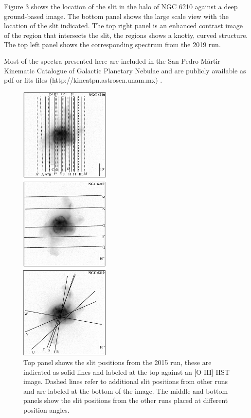 \documentclass[useAMS, usenatbib]{mnras}
\begin{document}
Figure 3 shows the location of the slit in the halo of NGC 6210  against a deep ground-based image. The bottom panel shows the large scale view with the location of the slit indicated. The top right panel is an enhanced contrast image of the region that intersects the slit, the regions shows a knotty, curved structure. The top left panel shows the corresponding spectrum from the 2019 run.


Most of the spectra presented here are included in the San Pedro M\'artir Kinematic Catalogue of Galactic Planetary Nebulae and are publicly available as pdf or fits files (http://kincatpn.astrosen.unam.mx)
\citep{Lopez:2012a}.

 \begin{figure}
\centering
  \includegraphics[width=0.4\textwidth]{tere-figs/Figure2a}
  \caption{Top panel shows the slit positions from the 2015 run, these are indicated as solid lines and 
labeled at the top against an [O III] HST image. Dashed lines refer to additional slit positions from other runs
and are labeled at the bottom of the image. The middle and bottom panels show the slit positions from 
the other runs placed at different position angles. }
  \label{fig:slit-positions}
\end{figure}
\end{document}
